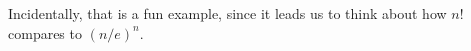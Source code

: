 \documentclass{ximera}
\begin{document}
\begin{question}
\begin{solution}
    
    \begin{multiple-choice}
    \end{multiple-choice}
    
  \end{solution}
\end{question}

Incidentally, that is a fun example, since it leads us to think about how \(n!\) compares to \((n/e)^n\).

\end{document}
